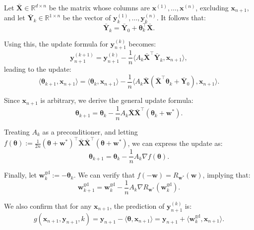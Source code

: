 \documentclass[11pt]{article}
\numberwithin{equation}{section}
\begin{document}
Let \( \mathbf{\bar{X}} \in \mathbb{R}^{d \times n} \) be the matrix whose columns are \( \mathbf{x}^{(1)}, \dots, \mathbf{x}^{(n)} \), excluding \( \mathbf{x}_{n+1} \), and let \( \mathbf{\bar{Y}}_k \in \mathbb{R}^{1 \times n} \) be the vector of \( \mathbf{y}^{(1)}_k, \dots, \mathbf{y}^{(n)}_k \). It follows that:
\[
\mathbf{\bar{Y}}_k = \mathbf{\bar{Y}}_0 + \mathbf{\theta}_k^\top \mathbf{\bar{X}}.
\]

Using this, the update formula for \( \mathbf{y}_{n+1}^{(k)} \) becomes:
\begin{equation}
\mathbf{y}_{n+1}^{(k+1)} = \mathbf{y}_{n+1}^{(k)} - \frac{1}{n} \langle A_k \mathbf{\bar{X}}^\top \mathbf{\bar{Y}}_k, \mathbf{x}_{n+1} \rangle,
\label{yn_update}
\end{equation}
leading to the update:
\begin{equation}
\langle \mathbf{\theta}_{k+1}, \mathbf{x}_{n+1} \rangle = \langle \mathbf{\theta}_k, \mathbf{x}_{n+1} \rangle - \frac{1}{n} \langle A_k \mathbf{\bar{X}} (\mathbf{\bar{X}}^\top \mathbf{\theta}_k + \mathbf{\bar{Y}}_0), \mathbf{x}_{n+1} \rangle.
\label{thetak_xn_update}
\end{equation}

Since \( \mathbf{x}_{n+1} \) is arbitrary, we derive the general update formula:
\begin{equation}
\mathbf{\theta}_{k+1} = \mathbf{\theta}_k - \frac{1}{n} A_k \mathbf{\bar{X}} \mathbf{\bar{X}}^\top (\mathbf{\theta}_k + \mathbf{w}^*).
\label{thetak_update}
\end{equation}

Treating \( A_k \) as a preconditioner, and letting \( f(\mathbf{\theta}) := \frac{1}{2n} (\mathbf{\theta} + \mathbf{w}^*)^\top \mathbf{\bar{X}} \mathbf{\bar{X}}^\top (\mathbf{\theta} + \mathbf{w}^*) \), we can express the update as:
\begin{equation}
\mathbf{\theta}_{k+1} = \mathbf{\theta}_k - \frac{1}{n} A_k \nabla f(\mathbf{\theta}).
\label{theta_k_preconditionedGD}
\end{equation}

Finally, let \( \mathbf{w}_k^{\text{gd}} := -\mathbf{\theta}_k \). We can verify that \( f(-\mathbf{w}) = R_{\mathbf{w}^*}(\mathbf{w}) \), implying that:
\begin{equation}
\mathbf{w}_{k+1}^{\text{gd}} = \mathbf{w}_k^{\text{gd}} - \frac{1}{n} A_k \nabla R_{\mathbf{w}^*}(\mathbf{w}_k^{\text{gd}}).
\label{wk_update}
\end{equation}

We also confirm that for any \( \mathbf{x}_{n+1} \), the prediction of \( \mathbf{y}_{n+1}^{(k)} \) is:
\[
g(\mathbf{x}_{n+1}, \mathbf{y}_{n+1}, k) = \mathbf{y}_{n+1} - \langle \mathbf{\theta}, \mathbf{x}_{n+1} \rangle = \mathbf{y}_{n+1} + \langle \mathbf{w}_k^{\text{gd}}, \mathbf{x}_{n+1} \rangle.
\]
\end{document}
